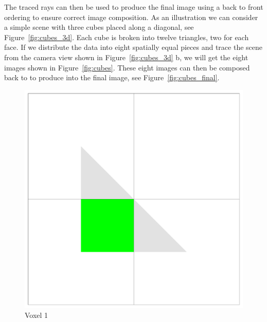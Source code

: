 The traced rays can then be used to produce the final image using a back to 
front ordering to ensure correct image composition.  As an illustration we can 
consider a simple scene with three cubes placed along a diagonal, 
see Figure~\ref{fig:cubes_3d}.  Each cube is broken into twelve triangles, two 
for each face.  If we distribute the data into eight spatially equal pieces and 
trace the scene from the camera view shown in Figure~\ref{fig:cubes_3d} b, we 
will get the eight images shown in Figure~\ref{fig:cubes}.  These eight images 
can then be composed back to to produce into the final image, see
Figure~\ref{fig:cubes_final}.

\begin{figure}[!htb]
  \includegraphics[width=\linewidth]{drawings/cubes_01.pdf}
  Voxel 1 
  

\end{figure}
